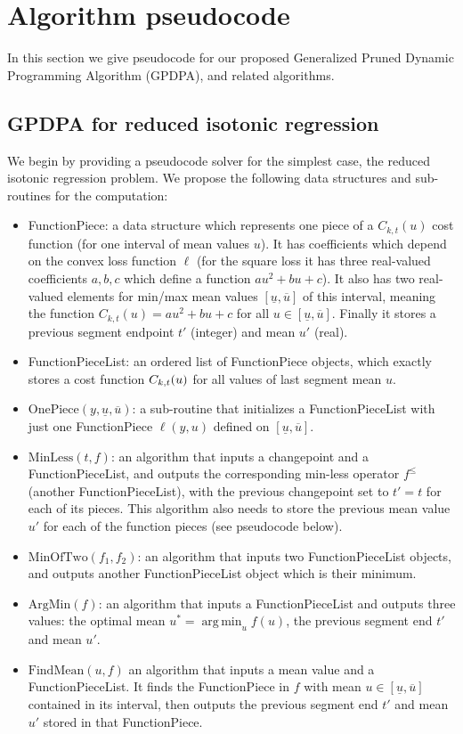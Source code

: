 \documentclass{article}
\DeclareMathOperator*{\argmin}{arg\,min}
\begin{document}
\section{Algorithm pseudocode}
\label{sec:pseudocode}
In this section we give pseudocode for our proposed Generalized Pruned
Dynamic Programming Algorithm (GPDPA), and related algorithms.
\subsection{GPDPA for reduced isotonic regression}
We begin by providing a pseudocode solver for the simplest case, the
reduced isotonic regression problem. We propose the following data
structures and sub-routines for the computation:
\begin{itemize}
\item FunctionPiece: a data structure which represents one piece of a
  $C_{k,t}(u)$ cost function (for one interval of mean values $u$). It
  has coefficients which depend on the convex loss function $\ell$
  (for the square loss it has three real-valued coefficients $a,b,c$
  which define a function $au^2 + bu + c$). It also has two
  real-valued elements for min/max mean values
  $[\underline u, \overline u]$ of this interval, meaning the function
  $C_{k,t}(u)=au^2 + bu + c$ for all
  $u\in[\underline u, \overline u]$. Finally it stores a previous
  segment endpoint $t'$ (integer) and mean $u'$ (real).
\item FunctionPieceList: an ordered list of FunctionPiece objects,
  which exactly stores a cost function $C_{k,t}(u)$ for all values
  of last segment mean $u$.
\item $\text{OnePiece}(y, \underline u, \overline u)$: a sub-routine
  that initializes a FunctionPieceList with just one FunctionPiece
  $\ell(y, u)$ defined on $[\underline u, \overline u]$.
\item $\text{MinLess}(t, f)$: an algorithm that inputs a changepoint
  and a FunctionPieceList, and outputs the corresponding min-less
  operator $f^\leq$ (another FunctionPieceList), with the previous
  changepoint set to $t'=t$ for each of its pieces. This algorithm
  also needs to store the previous mean value $u'$ for each of the
  function pieces (see pseudocode below). 
\item $\text{MinOfTwo} (f_1, f_2)$: an algorithm that inputs two
  FunctionPieceList objects, and outputs another FunctionPieceList
  object which is their minimum. 
\item $\text{ArgMin}(f)$: an algorithm that inputs a FunctionPieceList
  and outputs three values: the optimal mean $u^*=\argmin_u f(u)$, the
  previous segment end $t'$ and mean $u'$.
\item $\text{FindMean}(u, f)$ an algorithm that inputs a mean value
  and a FunctionPieceList. It finds the FunctionPiece in $f$ with mean
  $u\in[\underline u, \overline u]$ contained in its interval, then
  outputs the previous segment end $t'$ and mean $u'$ stored in that
  FunctionPiece.
\end{itemize}
\end{document}
